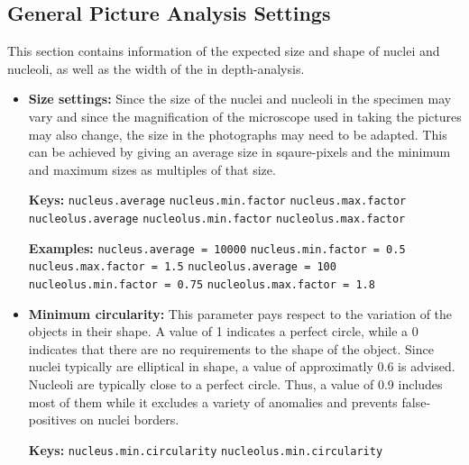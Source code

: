 \documentclass[a4paper, 12pt]{article}
\newcommand{\code}[1]{\colorbox{codegray}{\texttt{#1}}}
\begin{document}
\subsection{General Picture Analysis Settings}
This section contains information of the expected size and shape of nuclei and
nucleoli, as well as the width of the in depth-analysis.

\begin{itemize}
  \item \textbf{Size settings:} Since the size of the nuclei and nucleoli in the
  specimen may vary and since the magnification of the microscope used in taking the
  pictures may also change, the size in the photographs may need to be adapted.
  This can be achieved by giving an average size in sqaure-pixels and the
  minimum and maximum sizes as multiples of that size.
  
  \textbf{Keys:}
  \newline \code{nucleus.average}
  \newline \code{nucleus.min.factor}
  \newline \code{nucleus.max.factor}
  \newline \code{nucleolus.average}
  \newline \code{nucleolus.min.factor}
  \newline \code{nucleolus.max.factor}
  
  \textbf{Examples:}
  \newline \code{nucleus.average = 10000}
  \newline \code{nucleus.min.factor = 0.5}
  \newline \code{nucleus.max.factor = 1.5}
  \newline \code{nucleolus.average = 100}
  \newline \code{nucleolus.min.factor = 0.75}
  \newline \code{nucleolus.max.factor = 1.8}
  
  \item \textbf{Minimum circularity:} This parameter pays respect to the
  variation of the objects in their shape. A value of 1 indicates a perfect
  circle, while a 0 indicates that there are no requirements to the shape of the
  object. Since nuclei typically are elliptical in shape, a value of
  approximatly 0.6 is advised. Nucleoli are typically close to a perfect circle.
  Thus, a value of 0.9 includes most of them while it excludes a variety of
  anomalies and prevents false-positives on nuclei borders.
  
  \textbf{Keys:}
  \newline \code{nucleus.min.circularity}
  \newline \code{nucleolus.min.circularity}
  

\end{itemize}
\end{document}
